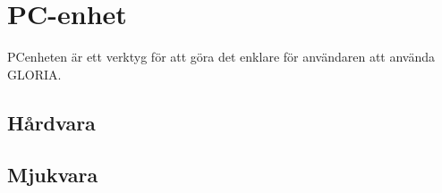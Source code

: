 
\section{PC-enhet}
PCenheten är ett verktyg för att göra det enklare för användaren att använda GLORIA.

\subsection{Hårdvara}

\subsection{Mjukvara}
